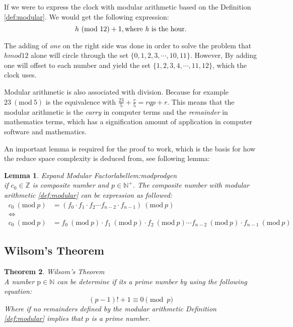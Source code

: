 \documentclass[12pt, oneside, onecolumn]{article}
\newtheorem{theorem}{Theorem}[section]
\newtheorem{lemma}[theorem]{Lemma}
\newcommand{\Mod}[1]{\ (\mathrm{mod}\ #1)}
\begin{document}
If we were to express the clock with modular arithmetic based on the Definition \ref{def:modular}. We would get the following expression:
\begin{equation}\label{equ:clock}
h\Mod{12} + 1, \text{where \emph{h} is the hour.}
\end{equation}

The adding of \emph{one} on the right side was done in order to solve the problem that $h mod 12$ alone will circle through the set $\{0,1,2,3,\cdots,10,11\}$. However, By adding one will offset to each number and yield the set $\{1,2,3,4,\cdots,11,12\}$, which the clock uses.

%
Modular arithmetic is also associated with division. Because for example $23\Mod{5}$ is the equivalence with $\frac{23}{5} + \frac{r}{5} = rqp + r$. This means that the modular arithmetic is the \emph{carry} in computer terms and the \emph{remainder} in mathematics terms, which has a signification amount of application in computer software and mathematics.

%
An important lemma is required for the proof to work, which is the basis for how the reduce space complexity is deduced from, see following lemma:
\begin{lemma}{Expand Modular Factor}label{lem:modprodgen}
\\
if $c_0 \in \mathbb{Z}$ is composite number and $p \in \mathbb{N}^{+}$. The composite number with modular arithmetic \ref{def:modular} can be expression as followed:
\begin{equation}\
\begin{split}
c_0 \Mod{p} &= (f_0 \cdot f_1 \cdot f_2 \cdots f_{n-2} \cdot f_{n-1} ) \Mod{p} \\
\iff \\
c_0 \Mod{p} &= f_0 \Mod{p} \cdot f_1 \Mod{p} \cdot f_2 \Mod{p} \cdots f_{n-2} \Mod{p} \cdot f_{n-1} \Mod{p}
\end{split}
\end{equation}
\end{lemma}

\subsection{Wilsom's Theorem}

\begin{theorem}{Wilsom's Theorem}\label{the:wilsomprime}
\\
A number $\text{p} \in \mathbb{N}$ can be determine if its a prime number by using the following equation:
\begin{equation}
(p - 1)! + 1 \equiv 0\pmod p
\end{equation}
Where if no remainders defined by the modular arithmetic Definition \ref{def:modular} implies that $p$ is a prime number.
\end{theorem}
\end{document}
